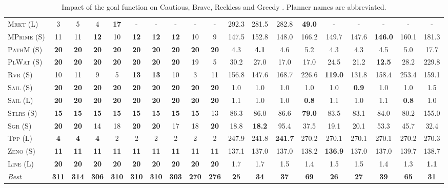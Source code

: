 \documentclass[11pt,landscape]{article}
\begin{document}
\begin{table}[tb]
{\begin{tabular}{|l||ccccccccc||ccccccccc||}
\textsc{Mrkt} (L)&3&5&4&\textbf{17}&-&-&-&-&-&292.3&281.5&282.8&\textbf{49.0}&-&-&-&-&-\\
\textsc{MPrime} (S)&11&11&\textbf{12}&10&\textbf{12}&\textbf{12}&\textbf{12}&10&9&147.5&152.8&148.0&166.2&149.7&147.6&\textbf{146.0}&160.1&181.3\\
\textsc{PathM} (S)&\textbf{20}&\textbf{20}&\textbf{20}&\textbf{20}&\textbf{20}&\textbf{20}&\textbf{20}&\textbf{20}&\textbf{20}&4.3&\textbf{4.1}&4.6&5.2&4.3&4.3&4.5&5.0&17.7\\
\textsc{PlWat} (S)&\textbf{20}&\textbf{20}&\textbf{20}&\textbf{20}&\textbf{20}&\textbf{20}&\textbf{20}&19&5&30.2&27.0&17.0&17.0&24.5&21.2&\textbf{12.5}&28.2&229.8\\
\textsc{Rvr} (S)&10&11&9&5&\textbf{13}&\textbf{13}&10&3&11&156.8&147.6&168.7&226.6&\textbf{119.0}&131.8&158.4&253.4&159.1\\
\textsc{Sail} (S)&\textbf{20}&\textbf{20}&\textbf{20}&\textbf{20}&\textbf{20}&\textbf{20}&\textbf{20}&\textbf{20}&\textbf{20}&1.0&1.0&1.0&1.0&1.0&\textbf{0.9}&1.0&1.0&1.5\\
\textsc{Sail} (L)&\textbf{20}&\textbf{20}&\textbf{20}&\textbf{20}&\textbf{20}&\textbf{20}&\textbf{20}&\textbf{20}&\textbf{20}&1.1&1.0&1.0&\textbf{0.8}&1.1&1.0&1.1&\textbf{0.8}&1.0\\
\textsc{Stlrs} (S)&\textbf{15}&\textbf{15}&\textbf{15}&\textbf{15}&\textbf{15}&\textbf{15}&\textbf{15}&\textbf{15}&13&86.3&86.0&86.6&\textbf{79.0}&83.5&83.1&84.0&80.2&155.0\\
\textsc{Sgr} (S)&\textbf{20}&\textbf{20}&14&18&\textbf{20}&\textbf{20}&17&18&\textbf{20}&18.8&\textbf{18.2}&95.4&37.5&19.1&20.1&53.3&45.7&32.4\\
\textsc{Tpp} (L)&\textbf{4}&\textbf{4}&\textbf{4}&2&2&2&2&2&2&247.9&241.8&\textbf{241.7}&270.2&270.1&270.1&270.1&270.2&270.3\\
\textsc{Zeno} (S)&\textbf{11}&\textbf{11}&\textbf{11}&\textbf{11}&\textbf{11}&\textbf{11}&\textbf{11}&\textbf{11}&\textbf{11}&137.1&137.0&137.0&138.2&\textbf{136.9}&137.0&137.0&139.7&138.7\\
\textsc{Line} (L)&\textbf{20}&\textbf{20}&\textbf{20}&\textbf{20}&\textbf{20}&\textbf{20}&\textbf{20}&\textbf{20}&\textbf{20}&1.7&1.7&1.5&1.4&1.5&1.5&1.4&1.3&\textbf{1.1}
\\\hline
\textit{Best}&\textbf{311}&\textbf{314}&\textbf{306}&\textbf{310}&\textbf{310}&\textbf{310}&\textbf{303}&\textbf{270}&\textbf{276}&\textbf{25}&\textbf{34}&\textbf{37}&\textbf{69}&\textbf{26}&\textbf{27}&\textbf{39}&\textbf{65}&\textbf{31}\\\hline

        \end{tabular}}
        \caption{Impact of the goal function on Cautious, Brave, Reckless and Greedy \pattyd. Planner names are abbreviated.}
        \label{tab:abl-gf}
        \end{table}
        
\end{document}
